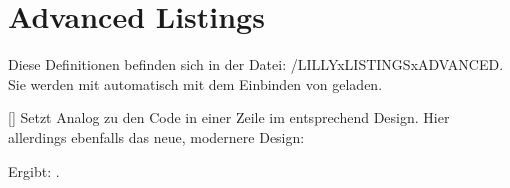 \section{Advanced Listings}

Diese Definitionen befinden sich in der Datei: {\ltt{}/LILLYxLISTINGSxADVANCED}. Sie werden mit  automatisch mit dem Einbinden von  geladen.

[]
Setzt Analog zu  den Code in einer Zeile im entsprechend Design. Hier allerdings ebenfalls das neue, modernere Design:
\begin{latex}
\end{latex}
Ergibt: .



% 
% 







